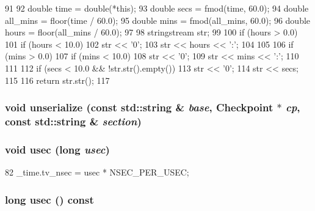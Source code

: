 \begin{DoxyCode}
91 {
92     double time = double(*this);
93     double secs = fmod(time, 60.0);
94     double all_mins = floor(time / 60.0);
95     double mins = fmod(all_mins, 60.0);
96     double hours = floor(all_mins / 60.0);
97 
98     stringstream str;
99 
100     if (hours > 0.0) {
101         if (hours < 10.0)
102             str << '0';
103         str << hours << ':';
104     }
105 
106     if (mins > 0.0) {
107         if (mins < 10.0)
108             str << '0';
109         str << mins << ':';
110     }
111 
112     if (secs < 10.0 && !str.str().empty())
113         str << '0';
114     str << secs;
115 
116     return str.str();
117 }
\end{DoxyCode}
\hypertarget{classTime_a147c320e3d6506edf5587a40cd8e430d}{
\subsubsection[{unserialize}]{\setlength{\rightskip}{0pt plus 5cm}void unserialize (const std::string \& {\em base}, \/  {\bf Checkpoint} $\ast$ {\em cp}, \/  const std::string \& {\em section})}}
\label{classTime_a147c320e3d6506edf5587a40cd8e430d}
\hypertarget{classTime_ad6a6ca797b40a92e72ce85c8acc337a7}{
\subsubsection[{usec}]{\setlength{\rightskip}{0pt plus 5cm}void usec (long {\em usec})}}
\label{classTime_ad6a6ca797b40a92e72ce85c8acc337a7}



\begin{DoxyCode}
82 { _time.tv_nsec = usec * NSEC_PER_USEC; }
\end{DoxyCode}
\hypertarget{classTime_a70d964ad0a91cc1ba79a20808c5139f7}{
\subsubsection[{usec}]{\setlength{\rightskip}{0pt plus 5cm}long usec () const}}
\label{classTime_a70d964ad0a91cc1ba79a20808c5139f7}



